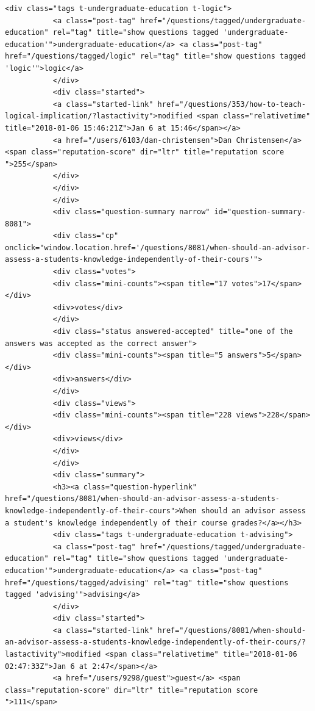 \documentclass[11pt]{article}
\begin{document}
\begin{Verbatim}[commandchars=\\\{\}]
           <div class="tags t-undergraduate-education t-logic">
           <a class="post-tag" href="/questions/tagged/undergraduate-education" rel="tag" title="show questions tagged 'undergraduate-education'">undergraduate-education</a> <a class="post-tag" href="/questions/tagged/logic" rel="tag" title="show questions tagged 'logic'">logic</a>
           </div>
           <div class="started">
           <a class="started-link" href="/questions/353/how-to-teach-logical-implication/?lastactivity">modified <span class="relativetime" title="2018-01-06 15:46:21Z">Jan 6 at 15:46</span></a>
           <a href="/users/6103/dan-christensen">Dan Christensen</a> <span class="reputation-score" dir="ltr" title="reputation score ">255</span>
           </div>
           </div>
           </div>
           <div class="question-summary narrow" id="question-summary-8081">
           <div class="cp" onclick="window.location.href='/questions/8081/when-should-an-advisor-assess-a-students-knowledge-independently-of-their-cours'">
           <div class="votes">
           <div class="mini-counts"><span title="17 votes">17</span></div>
           <div>votes</div>
           </div>
           <div class="status answered-accepted" title="one of the answers was accepted as the correct answer">
           <div class="mini-counts"><span title="5 answers">5</span></div>
           <div>answers</div>
           </div>
           <div class="views">
           <div class="mini-counts"><span title="228 views">228</span></div>
           <div>views</div>
           </div>
           </div>
           <div class="summary">
           <h3><a class="question-hyperlink" href="/questions/8081/when-should-an-advisor-assess-a-students-knowledge-independently-of-their-cours">When should an advisor assess a student's knowledge independently of their course grades?</a></h3>
           <div class="tags t-undergraduate-education t-advising">
           <a class="post-tag" href="/questions/tagged/undergraduate-education" rel="tag" title="show questions tagged 'undergraduate-education'">undergraduate-education</a> <a class="post-tag" href="/questions/tagged/advising" rel="tag" title="show questions tagged 'advising'">advising</a>
           </div>
           <div class="started">
           <a class="started-link" href="/questions/8081/when-should-an-advisor-assess-a-students-knowledge-independently-of-their-cours/?lastactivity">modified <span class="relativetime" title="2018-01-06 02:47:33Z">Jan 6 at 2:47</span></a>
           <a href="/users/9298/guest">guest</a> <span class="reputation-score" dir="ltr" title="reputation score ">111</span>

\end{Verbatim}
\end{document}

